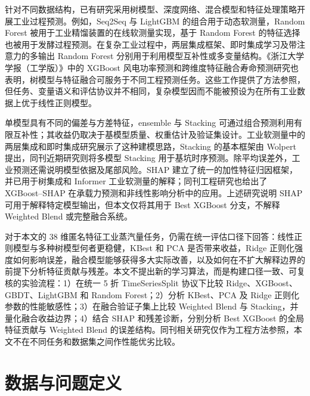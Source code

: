 \documentclass[UTF8,a4paper,twocolumn,zihao=5,fontset=none]{ctexart}
\begin{document}
针对不同数据结构，已有研究采用树模型、深度网络、混合模型和特征处理策略开展工业过程预测。例如，Seq2Seq 与 LightGBM 的组合用于动态软测量\citep{li2020seq2seq_lightgbm}，Random Forest 被用于工业精馏装置的在线软测量实现\citep{botha2021industrial_softsensor}，基于 Random Forest 的特征选择也被用于发酵过程预测\citep{hua2023rf_feature_selection}。在复杂工业过程中，两层集成框架、即时集成学习及带注意力的多输出 Random Forest 分别用于利用模型互补性或多变量结构\citep{wang2019two_layer_ensemble,pan2019ensemble_jit,wan2024wide_rf}。《浙江大学学报（工学版）》中的 XGBoost 风电功率预测和跨维度特征融合寿命预测研究也表明，树模型与特征融合可服务于不同工程预测任务\citep{wang2023zju_wind_xgboost,zhang2025zju_feature_fusion}。这些工作提供了方法参照，但任务、变量语义和评估协议并不相同，复杂模型因而不能被预设为在所有工业数据上优于线性正则模型。

单模型具有不同的偏差与方差特征，ensemble 与 Stacking 可通过组合预测利用有限互补性；其收益仍取决于基模型质量、权重估计及验证集设计。工业软测量中的两层集成和即时集成研究展示了这种建模思路\citep{wang2019two_layer_ensemble,pan2019ensemble_jit}，Stacking 的基本框架由 Wolpert 提出\citep{wolpert1992stacking}，同刊近期研究则将多模型 Stacking 用于基坑时序预测\citep{hu2025zju_stacking}。除平均误差外，工业预测还需说明模型依据及尾部风险。SHAP 建立了统一的加性特征归因框架\citep{lundberg2017shap}，并已用于树集成和 Informer 工业软测量的解释\citep{cao2023interpretable_softsensor,cao2024informer_shap}；同刊工程研究也给出了 XGBoost--SHAP 在承载力预测和非线性影响分析中的应用\citep{chen2023zju_xgboost_shap,lu2025zju_xgboost_shap}。上述研究说明 SHAP 可用于解释特定模型输出，但本文仅将其用于 Best XGBoost 分支，不解释 Weighted Blend 或完整融合系统。

对于本文的 38 维匿名特征工业蒸汽量任务，仍需在统一评估口径下回答：线性正则模型与多种树模型何者更稳健，KBest 和 PCA 是否带来收益，Ridge 正则化强度如何影响误差，融合模型能够获得多大实际改善，以及如何在不扩大解释边界的前提下分析特征贡献与残差。本文不提出新的学习算法，而是构建口径一致、可复核的实验流程：1）在统一 5 折 TimeSeriesSplit 协议下比较 Ridge、XGBoost、GBDT、LightGBM 和 Random Forest；2）分析 KBest、PCA 及 Ridge 正则化参数的性能敏感性；3）在融合验证子集上比较 Weighted Blend 与 Stacking，并量化融合收益边界；4）结合 SHAP 和残差诊断，分别分析 Best XGBoost 的全局特征贡献与 Weighted Blend 的误差结构。同刊相关研究仅作为工程方法参照\citep{chen2023zju_xgboost_shap,hu2025zju_stacking,zhang2025zju_feature_fusion,lu2025zju_xgboost_shap}，本文不在不同任务和数据集之间作性能优劣比较。

\section{数据与问题定义}
\end{document}
